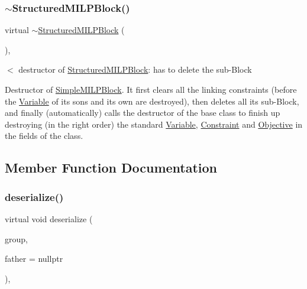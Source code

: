 \subsubsection{\texorpdfstring{$\sim$\+Structured\+M\+I\+L\+P\+Block()}{~StructuredMILPBlock()}}
{\footnotesize\ttfamily virtual $\sim$\mbox{\hyperlink{class_s_m_spp__di__unipi__it_1_1_structured_m_i_l_p_block}{Structured\+M\+I\+L\+P\+Block}} (\begin{DoxyParamCaption}{ }\end{DoxyParamCaption})\hspace{0.3cm}{\ttfamily [inline]}, {\ttfamily [virtual]}}



$<$ destructor of \mbox{\hyperlink{class_s_m_spp__di__unipi__it_1_1_structured_m_i_l_p_block}{Structured\+M\+I\+L\+P\+Block}}\+: has to delete the sub-\/\+Block 

Destructor of \mbox{\hyperlink{class_s_m_spp__di__unipi__it_1_1_simple_m_i_l_p_block}{Simple\+M\+I\+L\+P\+Block}}. It first clears all the linking constraints (before the \mbox{\hyperlink{class_s_m_spp__di__unipi__it_1_1_variable}{Variable}} of its sons and its own are destroyed), then deletes all its sub-\/\+Block, and finally (automatically) calls the destructor of the base class to finish up destroying (in the right order) the standard \mbox{\hyperlink{class_s_m_spp__di__unipi__it_1_1_variable}{Variable}}, \mbox{\hyperlink{class_s_m_spp__di__unipi__it_1_1_constraint}{Constraint}} and \mbox{\hyperlink{class_s_m_spp__di__unipi__it_1_1_objective}{Objective}} in the fields of the class. 

\subsection{Member Function Documentation}
\mbox{\label{class_s_m_spp__di__unipi__it_1_1_structured_m_i_l_p_block_a817e3ce47ea40c14517ec16c6b62b814}} 
\subsubsection{\texorpdfstring{deserialize()}{deserialize()}}
{\footnotesize\ttfamily virtual void deserialize (\begin{DoxyParamCaption}\item[{net\+C\+D\+F\+::\+Nc\+Group \&\&}]{group,  }\item[{\mbox{\hyperlink{class_s_m_spp__di__unipi__it_1_1_block}{Block}} $\ast$}]{father = {\ttfamily nullptr} }\end{DoxyParamCaption})\hspace{0.3cm}{\ttfamily [override]}, {\ttfamily [virtual]}}



